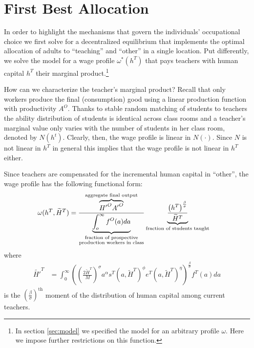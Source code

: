 \documentclass[onehalfspacing,11pt]{article}
\begin{document}
\section{First Best Allocation}\label{sec:firstbest}
In order to highlight the mechanisms that govern the individuals' occupational choice we first solve for a decentralized equilibrium that implements the optimal allocation of adults to ``teaching'' and ``other'' in a single location. Put differently, we solve the model for a wage profile $\omega^*(h^T)$ that pays teachers with human capital $h^T$ their marginal product.\footnote{In section \ref{sec:model} we specified the model for an arbitrary profile $\omega$. Here we impose further restrictions on this function.}

How can we characterize the teacher's marginal product? Recall that only workers produce the final (consumption) good using a linear production function with productivity $A^O$. Thanks to stable random matching of students to teachers the ability distribution of students is identical across class rooms and a teacher's marginal value only varies with the number of students in her class room, denoted by $N(h^t)$. Clearly, then, the wage profile is linear in $N(\cdot)$. Since $N$ is not linear in $h^T$ in general this implies that the wage profile is not linear in $h^T$ either.

Since teachers are compensated for the incremental human capital in ``other'', the wage profile has the following functional form:
\begin{align}
\label{}
   \omega(h^T,\widetilde{H}^T) & =  \frac{\overbrace{{H'}^O {A'}^O}^{\textrm{aggregate final output}}}{\underbrace{\int_o^\infty f^O(a) da}_{\begin{subarray}{c}\textrm{fraction of prospective} \\ \textrm{production workers in class}\end{subarray}}} \underbrace{\frac{\left( h^T \right)^{\frac{\beta}{\sigma}}}{{\widetilde{H}^T}}}_{\textrm{fraction of students taught}}
\end{align}
where
\begin{align*}
\label{}
  \widetilde{H'}^{T} & = \int_0^\infty \left(\left(\tfrac{2 \widetilde{H}^T}{M}\right)^\sigma a^\alpha s^T\left(a,\widetilde{H}^T\right)^\phi e^T(a,\widetilde{H}^T)^\eta \right)^{\frac{\beta}{\sigma}} f^T(a) da
\end{align*}
is the ${\left( \tfrac{\beta}{\sigma} \right)}^{\textrm{th}}$ moment of the distribution of human capital among current teachers.
\end{document}
